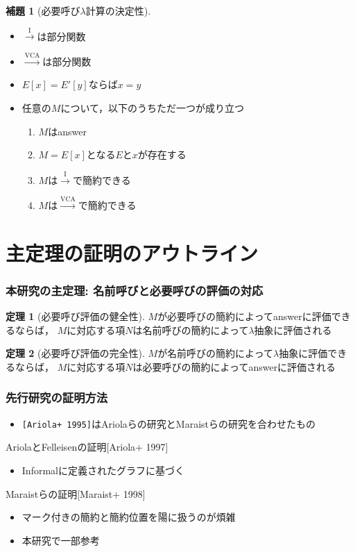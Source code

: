 \documentclass[dvipdfmx,cjk,xcolor=dvipsnames,envcountsect,notheorems,12pt]{beamer}
\theoremstyle{definition}
\newtheorem{theorem}{定理}
\newtheorem{lemma}{補題}
\newcommand{\CALLBYNEEDI}{\xrightarrow{\mathrm{I}}}
\newcommand{\CALLBYNEEDVCA}{\xrightarrow{\mathrm{VCA}}}
\begin{document}
\begin{frame}
	\begin{lemma}[必要呼び$\lambda$計算の決定性]
	\begin{itemize}
		\item $\CALLBYNEEDI$は部分関数
		\item $\CALLBYNEEDVCA$は部分関数
		\item $E[x]=E'[y]$ならば$x=y$
		\item 任意の$M$について，以下のうちただ一つが成り立つ
			\begin{enumerate}
				\item $M$はanswer
				\item $M=E[x]$となる$E$と$x$が存在する
				\item $M$は$\CALLBYNEEDI$で簡約できる
				\item $M$は$\CALLBYNEEDVCA$で簡約できる
			\end{enumerate}
	\end{itemize}
	\end{lemma}
\end{frame}

\section{主定理の証明のアウトライン}

\begin{frame}
	\frametitle{本研究の主定理: 名前呼びと必要呼びの評価の対応}
	\large
	\begin{theorem}[必要呼び評価の健全性]
		$M$が必要呼びの簡約によってanswerに評価できるならば，
		$M$に対応する項$N$は名前呼びの簡約によって$\lambda$抽象に評価される
	\end{theorem}
	\begin{theorem}[必要呼び評価の完全性]
		$M$が名前呼びの簡約によって$\lambda$抽象に評価できるならば，
		$M$に対応する項$N$は必要呼びの簡約によってanswerに評価される
	\end{theorem}
\end{frame}

\begin{frame}[fragile]
	\frametitle{先行研究の証明方法}
	\begin{itemize}
		\item \verb|[Ariola+ 1995]|はAriolaらの研究とMaraistらの研究を合わせたもの
	\end{itemize}
	\begin{itembox}[c]{AriolaとFelleisenの証明[Ariola+ 1997]}
		\begin{itemize}
			\item Informalに定義されたグラフに基づく
		\end{itemize}
	\end{itembox}
	\begin{itembox}[c]{Maraistらの証明[Maraist+ 1998]}
		\begin{itemize}
			\item マーク付きの簡約と簡約位置を陽に扱うのが煩雑
			\item 本研究で一部参考
		\end{itemize}
	\end{itembox}
\end{frame}
\end{document}
